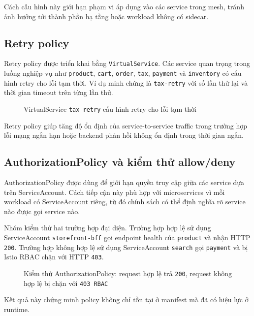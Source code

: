 Cách cấu hình này giới hạn phạm vi áp dụng vào các service trong mesh, tránh ảnh hưởng tới thành phần hạ tầng hoặc workload không có sidecar.

\subsection{Retry policy}

Retry policy được triển khai bằng \texttt{VirtualService}. Các service quan trọng trong luồng nghiệp vụ như \texttt{product}, \texttt{cart}, \texttt{order}, \texttt{tax}, \texttt{payment} và \texttt{inventory} có cấu hình retry cho lỗi tạm thời. Ví dụ minh chứng là \texttt{tax-retry} với số lần thử lại và thời gian timeout trên từng lần thử.

\begin{figure}[H]
\centering
{}
\caption{VirtualService \texttt{tax-retry} cấu hình retry cho lỗi tạm thời}
\end{figure}

Retry policy giúp tăng độ ổn định của service-to-service traffic trong trường hợp lỗi mạng ngắn hạn hoặc backend phản hồi không ổn định trong thời gian ngắn.

\subsection{AuthorizationPolicy và kiểm thử allow/deny}

AuthorizationPolicy được dùng để giới hạn quyền truy cập giữa các service dựa trên ServiceAccount. Cách tiếp cận này phù hợp với microservices vì mỗi workload có ServiceAccount riêng, từ đó chính sách có thể định nghĩa rõ service nào được gọi service nào.

Nhóm kiểm thử hai trường hợp đại diện. Trường hợp hợp lệ sử dụng ServiceAccount \texttt{storefront-bff} gọi endpoint health của \texttt{product} và nhận HTTP \texttt{200}. Trường hợp không hợp lệ sử dụng ServiceAccount \texttt{search} gọi \texttt{payment} và bị Istio RBAC chặn với HTTP \texttt{403}.

\begin{figure}[H]
\centering
{}
\caption{Kiểm thử AuthorizationPolicy: request hợp lệ trả \texttt{200}, request không hợp lệ bị chặn với \texttt{403 RBAC}}
\end{figure}

Kết quả này chứng minh policy không chỉ tồn tại ở manifest mà đã có hiệu lực ở runtime.

